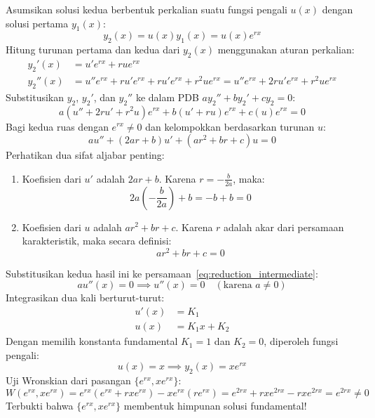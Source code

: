 \documentclass[11pt,a4paper]{article}
\theoremstyle{definition}
\begin{document}
Asumsikan solusi kedua berbentuk perkalian suatu fungsi pengali $u(x)$ dengan solusi pertama $y_1(x)$:
\begin{equation}
    y_2(x) = u(x) y_1(x) = u(x) e^{rx}
\end{equation}
Hitung turunan pertama dan kedua dari $y_2(x)$ menggunakan aturan perkalian:
\begin{align}
    y_2'(x) &= u' e^{rx} + r u e^{rx} \\
    y_2''(x) &= u'' e^{rx} + r u' e^{rx} + r u' e^{rx} + r^2 u e^{rx} = u'' e^{rx} + 2r u' e^{rx} + r^2 u e^{rx}
\end{align}
Substitusikan $y_2$, $y_2'$, dan $y_2''$ ke dalam PDB $a y_2'' + b y_2' + c y_2 = 0$:
\begin{equation}
    a \left( u'' + 2r u' + r^2 u \right) e^{rx} + b \left( u' + r u \right) e^{rx} + c \left( u \right) e^{rx} = 0
\end{equation}
Bagi kedua ruas dengan $e^{rx} \neq 0$ dan kelompokkan berdasarkan turunan $u$:
\begin{equation}
    a u'' + \left( 2ar + b \right) u' + \left( a r^2 + b r + c \right) u = 0
    \label{eq:reduction_intermediate}
\end{equation}
Perhatikan dua sifat aljabar penting:
\begin{enumerate}[leftmargin=*]
    \item Koefisien dari $u'$ adalah $2ar + b$. Karena $r = -\frac{b}{2a}$, maka:
    \begin{equation*}
        2a\left(-\frac{b}{2a}\right) + b = -b + b = 0
    \end{equation*}
    \item Koefisien dari $u$ adalah $a r^2 + b r + c$. Karena $r$ adalah akar dari persamaan karakteristik, maka secara definisi:
    \begin{equation*}
        a r^2 + b r + c = 0
    \end{equation*}
\end{enumerate}
Substitusikan kedua hasil ini ke persamaan~\eqref{eq:reduction_intermediate}:
\begin{equation}
    a u''(x) = 0 \implies u''(x) = 0 \quad (\text{karena } a \neq 0)
\end{equation}
Integrasikan dua kali berturut-turut:
\begin{align*}
    u'(x) &= K_1 \\
    u(x) &= K_1 x + K_2
\end{align*}
Dengan memilih konstanta fundamental $K_1 = 1$ dan $K_2 = 0$, diperoleh fungsi pengali:
\begin{equation}
    u(x) = x \implies y_2(x) = x e^{rx}
    \label{eq:second_solution_repeated}
\end{equation}
Uji Wronskian dari pasangan $\{e^{rx}, x e^{rx}\}$:
\begin{equation}
    W(e^{rx}, x e^{rx}) = e^{rx} \left( e^{rx} + r x e^{rx} \right) - x e^{rx} \left( r e^{rx} \right) = e^{2rx} + r x e^{2rx} - r x e^{2rx} = e^{2rx} \neq 0
\end{equation}
Terbukti bahwa $\{e^{rx}, x e^{rx}\}$ membentuk himpunan solusi fundamental!
\end{document}
